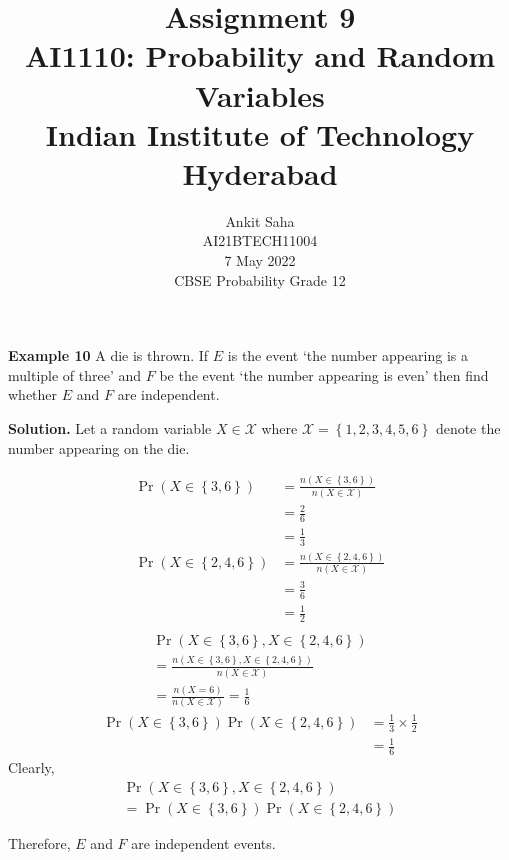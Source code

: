 \documentclass[journal,12pt,twocolumn]{IEEEtran}
\title{Assignment 9 \\ \Large AI1110: Probability and Random Variables \\ \large Indian Institute of Technology Hyderabad}
\author{Ankit Saha \\ \normalsize AI21BTECH11004 \\ \vspace*{20pt} \normalsize  7 May 2022 \\ \vspace*{20pt} \Large CBSE Probability Grade 12}
\providecommand{\pr}[1]{\ensuremath{\Pr\left(#1\right)}}
\providecommand{\cbrak}[1]{\ensuremath{\left\{#1\right\}}}
\begin{document}
	\maketitle
	
	\textbf{Example 10} 
	A die is thrown. If $E$ is the event `the number appearing is a multiple of three' and $F$ be the event `the number appearing is even' then find whether $E$ and $F$ are independent.	 
	
	\textbf{Solution.}
	Let a random variable $X \in \mathcal{X}$ where $\mathcal{X} = \cbrak{1,2,3,4,5,6}$ denote the number appearing on the die.
	\begin{table}[ht!]
		\centering
		
		\caption{}
		\label{table:table1}	
	\end{table}	
	\begin{align}
		\pr{X \in \cbrak{3,6}} &= \frac{n(X \in \cbrak{3,6})}{n(X \in \mathcal{X})} \\
		&= \frac26 \\
		&= \frac13 \\
		\pr{X \in \cbrak{2,4,6}} &= \frac{n(X \in \cbrak{2,4,6})}{n(X \in \mathcal{X})} \\
		&= \frac36 \\
		&= \frac12 \\
	\end{align}
	\begin{multline}
		\pr{X \in \cbrak{3,6}, X \in \cbrak{2,4,6}} \\
		= \frac{n(X \in \cbrak{3,6}, X \in \cbrak{2,4,6})}{n(X \in \mathcal{X})} \\
		= \frac{n(X = 6)}{n(X \in \mathcal{X})} = \frac16
	\end{multline}
	\begin{align}
		\pr{X \in \cbrak{3,6}} \pr{X \in \cbrak{2,4,6}} &= \frac13 \times \frac12 \\
		&= \frac16
	\end{align}
	Clearly, 
	\begin{multline}
		\pr{X \in \cbrak{3,6}, X \in \cbrak{2,4,6}} \\
		= \pr{X \in \cbrak{3,6}} \pr{X \in \cbrak{2,4,6}}
	\end{multline}
	
	Therefore, $E$ and $F$ are independent events.
			
\end{document}
